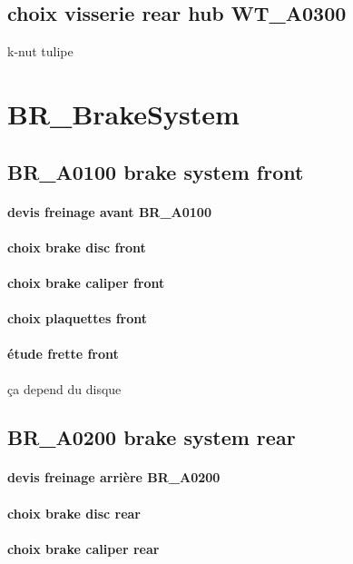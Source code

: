 	\subsection*{choix visserie rear hub WT\_A0300} 
 \par k-nut tulipe
\newpage 
 \section*{BR\_BrakeSystem} 
 \par 
	\subsection*{BR\_A0100 brake system front} 
 \par 
		\paragraph{devis freinage avant BR\_A0100} 
		\paragraph{choix brake disc front} 
		\paragraph{choix brake caliper front} 
		\paragraph{choix plaquettes front} 
		\paragraph{étude frette front} ça depend du disque
	\subsection*{BR\_A0200 brake system rear} 
 \par 
		\paragraph{devis freinage arrière BR\_A0200} 
		\paragraph{choix brake disc rear} 
		\paragraph{choix brake caliper rear} 
